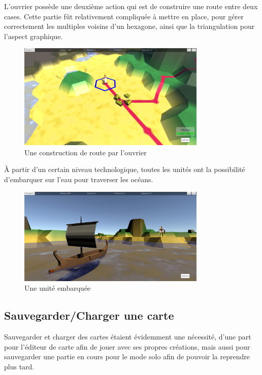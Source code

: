 \documentclass[12pt]{report}
\begin{document}
L’ouvrier possède une deuxième action qui est de construire une route entre deux
cases. Cette partie fût relativement compliquée à mettre en place, pour gérer
correctement les multiples voisins d’un hexagone, ainsi que la triangulation
pour l’aspect graphique.

\begin{figure}[H]
    \centering
    \includegraphics[width=0.8\textwidth]{worker_road}
    \caption*{Une construction de route par l'ouvrier}
\end{figure}

À partir d'un certain niveau technologique, toutes les unités ont la
possibilité d'embarquer sur l'eau pour traverser les océans.

\begin{figure}[H]
    \centering
    \includegraphics[width=0.8\textwidth]{boat}
    \caption*{Une unité embarquée}
\end{figure}

\subsection{Sauvegarder/Charger une carte}

Sauvegarder et charger des cartes étaient évidemment une nécessité, d’une part
pour l’éditeur de carte afin de jouer avec ses propres créations, mais aussi
pour sauvegarder une partie en cours pour le mode solo afin de pouvoir la
reprendre plus tard.
\end{document}
